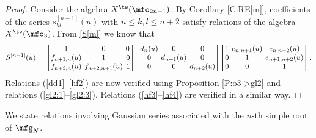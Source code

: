 \documentclass{amsart}
\numberwithin{equation}{section}
\theoremstyle{remark}
\renewcommand{\,}{\kern 0.1em} %
\begin{document}
\begin{proof}
%
Consider the algebra $X^{\tw}(\mfo_{2n+1})$. By Corollary \ref{C:RE[m]}, coefficients of the series $s^{[n-1]}_{kl}(u)$ with $n\le k,l\le n+2$ satisfy relations of the algebra $X^{\tw}(\mfo_{3})$. From \eqref{S[m]} we know that
%
\[
\setlength\arraycolsep{2pt}
S^{[n-1]}(u) = 
\begin{bmatrix}
1 & 0 & 0\, \\
f_{n+1,n}(u) & 1 & 0 \\
f_{n+2,n}(u) & f_{n+2,n+1}(u) & 1
\end{bmatrix} \!
\begin{bmatrix}
d_{n}(u) & 0 & 0 \\
0 & d_{n+1}(u) & 0 \\
0 & 0 & d_{n+2}(u)
\end{bmatrix} \!
\begin{bmatrix}
1 & e_{n,n+1}(u) & e_{n,n+2}(u) \\
0 & 1 & e_{n+1,n+2}(u) \\
0 & 0 & 1
\end{bmatrix} .
\]
Relations (\ref{dd1}--\ref{hf2}) are now verified using Proposition \ref{P:o3->gl2} and relations (\ref{gl2:1}--\ref{gl2:3}). 
Relations (\ref{hf3}--\ref{hf4}) are verified in a similar way.
%
\end{proof}


We state relations involving Gaussian series associated with the $n$-th simple root of $\mfg_N$.
\end{document}
